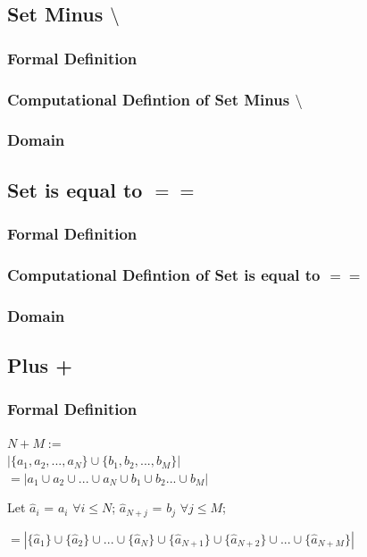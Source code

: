\documentclass[11pt]{article}
\begin{document}
\subsection{Set Minus $\setminus$}
\subsubsection{Formal Definition}
\subsubsection{Computational Defintion of Set Minus $\setminus$}
\subsubsection{Domain}






\subsection{Set is equal to $==$}
\subsubsection{Formal Definition}
\subsubsection{Computational Defintion of Set is equal to $==$}
\subsubsection{Domain}




\subsection{Plus +}
\subsubsection{Formal Definition}
\begin{center}
\vspace{1mm}
$
N + M :=
$
\\ \vspace{2mm}
$
| \{a_1,a_2,...,a_N\} \cup \{b_1,b_2,...,b_M\} |
$
\\ \vspace{2mm}
$
= | a_1 \cup a_2 \cup ... \cup a_N \cup b_1 \cup b_2 ... \cup b_M |
$
\end{center}
Let $\hat{a}_{i}$ = $a_i$ \hspace{2mm} $\forall i \leq N$; \hspace{2mm} $\hat{a}_{N+j}$ = $b_j$ \hspace{2mm} $\forall j \leq M$; 
\begin{center}
$
= |\{\hat{a}_1\} \cup \{\hat{a}_2\} \cup ... \cup \{\hat{a}_N\} \cup \{\hat{a}_{N+1}\} \cup \{\hat{a}_{N+2}\} \cup ... \cup \{\hat{a}_{N+M}\}|
$
\end{center}
\end{document}
